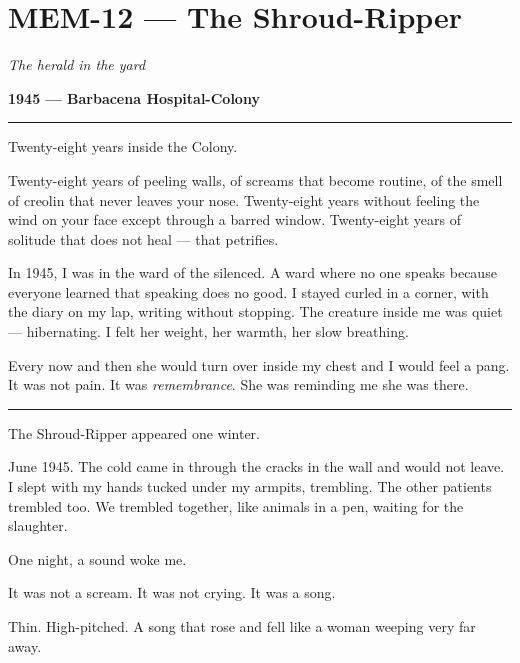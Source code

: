 \section*{\textbf{MEM-12} --- The Shroud-Ripper}

\noindent \textit{The herald in the yard}

\noindent \textbf{1945 --- Barbacena Hospital-Colony}

\vspace{0.5em}\noindent\rule{\textwidth}{0.5pt}\vspace{0.5em}

\noindent Twenty-eight years inside the Colony.

\noindent Twenty-eight years of peeling walls, of screams that become routine, of the smell of creolin that never leaves your nose. Twenty-eight years without feeling the wind on your face except through a barred window. Twenty-eight years of solitude that does not heal --- that petrifies.

\noindent In 1945, I was in the ward of the silenced. A ward where no one speaks because everyone learned that speaking does no good. I stayed curled in a corner, with the diary on my lap, writing without stopping. The creature inside me was quiet --- hibernating. I felt her weight, her warmth, her slow breathing.

\noindent Every now and then she would turn over inside my chest and I would feel a pang. It was not pain. It was \textit{remembrance}. She was reminding me she was there.

\vspace{0.5em}\noindent\rule{\textwidth}{0.5pt}\vspace{0.5em}

\noindent The Shroud-Ripper appeared one winter.

\noindent June 1945. The cold came in through the cracks in the wall and would not leave. I slept with my hands tucked under my armpits, trembling. The other patients trembled too. We trembled together, like animals in a pen, waiting for the slaughter.

\noindent One night, a sound woke me.

\noindent It was not a scream.
It was not crying.
It was a song.

\noindent Thin. High-pitched. A song that rose and fell like a woman weeping very far away.

